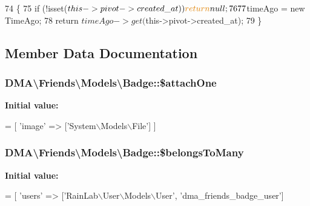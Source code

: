 \begin{DoxyCode}
74     \{
75         \textcolor{keywordflow}{if} (!isset($this->pivot->created\_at)) \textcolor{keywordflow}{return} null;
76 
77         $timeAgo = \textcolor{keyword}{new} TimeAgo;
78         \textcolor{keywordflow}{return} $timeAgo->get($this->pivot->created\_at);
79     \}
\end{DoxyCode}


\subsection{Member Data Documentation}
\hypertarget{classDMA_1_1Friends_1_1Models_1_1Badge_abd4795b249f74dd23651f51479fbe5fb}{
\subsubsection[{\$attach\-One}]{\setlength{\rightskip}{0pt plus 5cm}D\-M\-A\textbackslash{}\-Friends\textbackslash{}\-Models\textbackslash{}\-Badge\-::\$attach\-One}}\label{classDMA_1_1Friends_1_1Models_1_1Badge_abd4795b249f74dd23651f51479fbe5fb}
{\bfseries Initial value\-:}
\begin{DoxyCode}
= [
        \textcolor{stringliteral}{'image'} => [\textcolor{stringliteral}{'System\(\backslash\)Models\(\backslash\)File'}]
    ]
\end{DoxyCode}
\hypertarget{classDMA_1_1Friends_1_1Models_1_1Badge_ab143958e8f63d5b612832fee145f0aa1}{
\subsubsection[{\$belongs\-To\-Many}]{\setlength{\rightskip}{0pt plus 5cm}D\-M\-A\textbackslash{}\-Friends\textbackslash{}\-Models\textbackslash{}\-Badge\-::\$belongs\-To\-Many}}\label{classDMA_1_1Friends_1_1Models_1_1Badge_ab143958e8f63d5b612832fee145f0aa1}
{\bfseries Initial value\-:}
\begin{DoxyCode}
= [
        \textcolor{stringliteral}{'users'} => [\textcolor{stringliteral}{'RainLab\(\backslash\)User\(\backslash\)Models\(\backslash\)User'}, \textcolor{stringliteral}{'dma\_friends\_badge\_user'}]
\end{DoxyCode}
